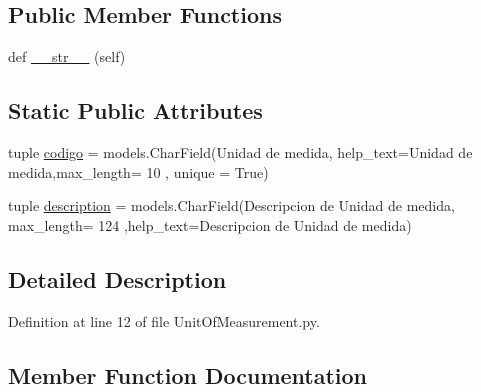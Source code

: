 \subsection*{Public Member Functions}
\begin{DoxyCompactItemize}
\item 
def \hyperlink{class_ground_segment_1_1models_1_1_unit_of_measurement_1_1_unit_of_measurement_a3164e85d5e824ed0a43db4694cb71153}{\+\_\+\+\_\+str\+\_\+\+\_\+} (self)
\end{DoxyCompactItemize}
\subsection*{Static Public Attributes}
\begin{DoxyCompactItemize}
\item 
tuple \hyperlink{class_ground_segment_1_1models_1_1_unit_of_measurement_1_1_unit_of_measurement_afa5800598e943c6e2c5491b3ceb779d9}{codigo} = models.\+Char\+Field(\textquotesingle{}Unidad de medida\textquotesingle{}, help\+\_\+text=\textquotesingle{}Unidad de medida\textquotesingle{},max\+\_\+length= 10 , unique = True)
\item 
tuple \hyperlink{class_ground_segment_1_1models_1_1_unit_of_measurement_1_1_unit_of_measurement_af5e86d6481f747cb195f7532f3e27d21}{description} = models.\+Char\+Field(\textquotesingle{}Descripcion de Unidad de medida\textquotesingle{}, max\+\_\+length= 124 ,help\+\_\+text=\textquotesingle{}Descripcion de Unidad de medida\textquotesingle{})
\end{DoxyCompactItemize}


\subsection{Detailed Description}


Definition at line 12 of file Unit\+Of\+Measurement.\+py.



\subsection{Member Function Documentation}
\hypertarget{class_ground_segment_1_1models_1_1_unit_of_measurement_1_1_unit_of_measurement_a3164e85d5e824ed0a43db4694cb71153}{}
